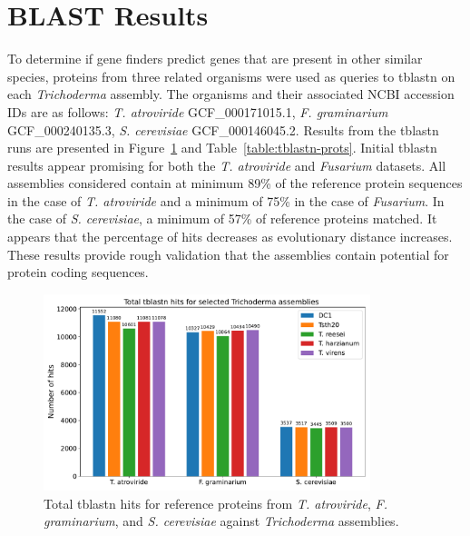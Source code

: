 \section{BLAST Results}\label{section:blast}

To determine if gene finders predict genes that are present in other similar species, proteins from three related organisms were used as
queries to tblastn\cite{altschul1990a} on each \textit{Trichoderma}
assembly. The organisms and their associated NCBI accession IDs are as
follows: \textit{T. atroviride} \- GCF\_000171015.1,
\textit{F. graminarium} \- GCF\_000240135.3, \textit{S. cerevisiae} \-
GCF\_000146045.2.  Results from the tblastn runs are presented in
Figure~\ref{fig:blast-total-counts} and Table~\ref{table:tblastn-prots}. Initial tblastn results appear
promising for both the \textit{T. atroviride} and \textit{Fusarium}
datasets. All assemblies considered contain at minimum 89\% of the
reference protein sequences in the case of \textit{T. atroviride} and
a minimum of 75\% in the case of \textit{Fusarium}. In the case of
\textit{S. cerevisiae}, a minimum of 57\% of reference proteins
matched. It appears that the percentage of hits decreases as
evolutionary distance increases. These results provide rough
validation that the assemblies contain potential for protein coding
sequences.

\begin{figure}
  \centering
  \includegraphics[width=0.85\textwidth]{figures/blast-total-counts.pdf}
  \caption[Total tblastn hits]{Total tblastn hits for reference proteins from \textit{T. atroviride}, \textit{F. graminarium}, and \textit{S. cerevisiae} against \textit{Trichoderma} assemblies.}\label{fig:blast-total-counts}
\end{figure}

